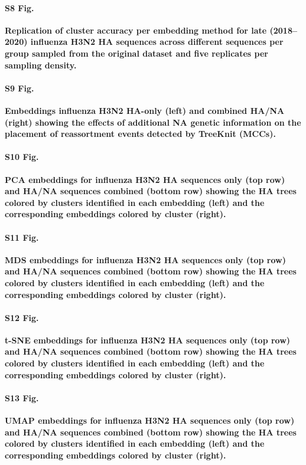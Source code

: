 \documentclass[10pt,letterpaper]{article}
\begin{document}
\paragraph*{S8 Fig.}
\label{S_Fig_late_flu_replication_of_cluster_accuracy}
{\bf Replication of cluster accuracy per embedding method for late (2018--2020) influenza H3N2 HA sequences across different sequences per group sampled from the original dataset and five replicates per sampling density.}

\paragraph*{S9 Fig.}
\label{S_Fig_full_ha_na_embeddings}
{\bf Embeddings influenza H3N2 HA-only (left) and combined HA/NA (right) showing the effects of additional NA genetic information on the placement of reassortment events detected by TreeKnit (MCCs).}

\paragraph*{S10 Fig.}
\label{S_Fig_flu_ha_na_pca_embeddings}
{\bf PCA embeddings for influenza H3N2 HA sequences only (top row) and HA/NA sequences combined (bottom row) showing the HA trees colored by clusters identified in each embedding (left) and the corresponding embeddings colored by cluster (right).}

\paragraph*{S11 Fig.}
\label{S_Fig_flu_ha_na_mds_embeddings}
{\bf MDS embeddings for influenza H3N2 HA sequences only (top row) and HA/NA sequences combined (bottom row) showing the HA trees colored by clusters identified in each embedding (left) and the corresponding embeddings colored by cluster (right).}

\paragraph*{S12 Fig.}
\label{S_Fig_flu_ha_na_tsne_embeddings}
{\bf t-SNE embeddings for influenza H3N2 HA sequences only (top row) and HA/NA sequences combined (bottom row) showing the HA trees colored by clusters identified in each embedding (left) and the corresponding embeddings colored by cluster (right).}

\paragraph*{S13 Fig.}
\label{S_Fig_flu_ha_na_umap_embeddings}
{\bf UMAP embeddings for influenza H3N2 HA sequences only (top row) and HA/NA sequences combined (bottom row) showing the HA trees colored by clusters identified in each embedding (left) and the corresponding embeddings colored by cluster (right).}
\end{document}
